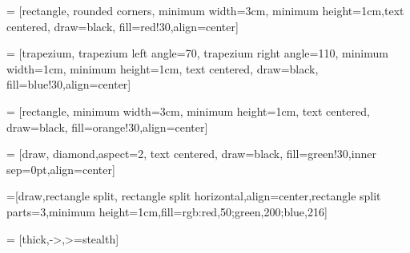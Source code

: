 \usetikzlibrary{arrows.meta}

 = [rectangle, rounded corners, minimum width=3cm, minimum height=1cm,text centered, draw=black, fill=red!30,align=center]

 = [trapezium, trapezium left angle=70, trapezium right angle=110, minimum width=1cm, minimum height=1cm, text centered, draw=black, fill=blue!30,align=center]

 = [rectangle, minimum width=3cm, minimum height=1cm, text centered, draw=black, fill=orange!30,align=center]


 = [draw, diamond,aspect=2, text centered, draw=black, fill=green!30,inner sep=0pt,align=center]

=[draw,rectangle split, rectangle split horizontal,align=center,rectangle split parts=3,minimum height=1cm,fill={rgb:red,50;green,200;blue,216}]

 = [thick,->,>=stealth]


